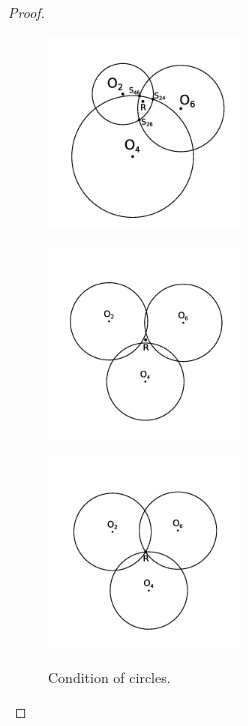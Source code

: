 \documentclass[suppldata, dvipdfmx]{interact}
\theoremstyle{plain}%
\theoremstyle{definition}
\theoremstyle{remark}
\theoremstyle{problemstyle}
\begin{document}
\begin{proof}
\begin{figure}[h!tbp]
  \begin{minipage}[t]{0.3\textwidth}
   \centering
   \includegraphics[width=2in, keepaspectratio]{./img/HexahedraWithSphericalFaces/threeCircles1.jpg}
   \subcaption{}
   \label{fig:condition1}
  \end{minipage}
 \hspace*{\fill}
  \begin{minipage}[t]{0.3\textwidth}
   \centering
   \includegraphics[width=2in, keepaspectratio]{./img/HexahedraWithSphericalFaces/threeCircles2.jpg}
   \subcaption{}
   \label{fig:condition2}
  \end{minipage}
  \hspace*{\fill}
  \begin{minipage}[t]{0.3\textwidth}
   \centering
   \includegraphics[width=2in, keepaspectratio]{./img/HexahedraWithSphericalFaces/threeCircles3.jpg}
   \subcaption{}
   \label{fig:condition3}
  \end{minipage}
  \caption{Condition of circles.}
  \label{fig:threeCircles}
\end{figure}


\end{proof}
\end{document}
